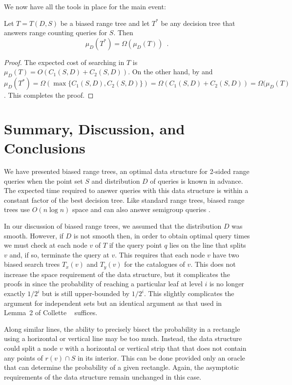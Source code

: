 \documentclass[lotsofwhite,charterfonts]{patmorin}
\begin{document}
We now have all the tools in place for the main event:

\begin{thm}
Let $T=T(D,S)$ be a biased range tree and let $T^*$ be any decision
tree that answers range counting queries for $S$.  Then
\[
  \mu_D(T^*) = \Omega(\mu_D(T)) \enspace .
\]
\end{thm}

\begin{proof}
The expected cost of searching in $T$ is $\mu_D(T)=O(C_1(S,D)+C_2(S,D))$.
On the other hand, by  and  $\mu_D(T^*) =
\Omega(\max\{C_1(S,D),C_2(S,D)\}) =
\Omega(C_1(S,D)+C_2(S,D))=\Omega(\mu_D(T)$.  This completes the proof.
\end{proof}

\section{Summary, Discussion, and Conclusions}

We have presented biased range trees, an optimal data structure for
2-sided range queries when the point set $S$ and distribution $D$ of
queries is known in advance. The expected time required to answer
queries with this data structure is within a constant factor of the
best decision tree.  Like standard range trees, biased range trees use
$O(n\log n)$ space and can also answer semigroup queries
\cite{semigroup}.

In our discussion of biased range trees, we assumed that the
distribution $D$ was smooth.  However, if $D$ is not smooth then, in
order to obtain optimal query times we must check at each node $v$ of
$T$ if the query point $q$ lies on the line that splits $v$ and, if
so, terminate the query at $v$.  This requires that each node $v$ have
two biased search trees $T_x(v)$ and $T_y(v)$ for the catalogues of
$v$. This does not increase the space requirement of the data
structure, but it complicates the proofs in  since the
probability of reaching a particular leaf at level $i$ is no longer
exactly $1/2^i$ but is still upper-bounded by $1/2^i$.  This slightly
complicates the argument for independent sets but an identical
argument as that used in Lemma~2 of Collette \etal\ \cite{X} suffices.

Along similar lines, the ability to precisely bisect the probability
in a rectangle using a horizontal or vertical line may be too much.
Instead, the data structure could split a node $v$ with a horizontal or
vertical strip that that does not contain any points of $r(v)\cap S$
in its interior.  This can be done provided only an oracle that can
determine the probability of a given rectangle.  Again, the asymptotic
requirements of the data structure remain unchanged in this case.
\end{document}
